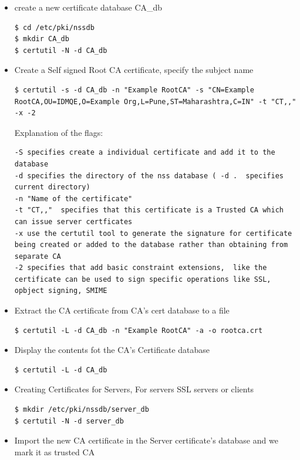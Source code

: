 \documentclass[12pt]{report}
\begin{document}
\begin{enumerate}[label*=\arabic*.]
\begin{itemize}
            \item create a new certificate database CA\_db
                \begin{lstlisting}[style=BashInputStyle]
$ cd /etc/pki/nssdb
$ mkdir CA_db
$ certutil -N -d CA_db
                \end{lstlisting}
            \item Create a Self signed Root CA certificate, specify the subject name
                \begin{lstlisting}[style=BashInputStyle]
$ certutil -s -d CA_db -n "Example RootCA" -s "CN=Example RootCA,OU=IDMQE,O=Example Org,L=Pune,ST=Maharashtra,C=IN" -t "CT,," -x -2
                \end{lstlisting}
                Explanation of the flags:
                \begin{lstlisting}
-S specifies create a individual certificate and add it to the database
-d specifies the directory of the nss database ( -d .  specifies current directory)
-n "Name of the certificate"
-t "CT,,"  specifies that this certificate is a Trusted CA which can issue server certficates
-x use the certutil tool to generate the signature for certificate being created or added to the database rather than obtaining from separate CA
-2 specifies that add basic constraint extensions,  like the certificate can be used to sign specific operations like SSL, opbject signing, SMIME
                \end{lstlisting}
            \item Extract the CA certificate from CA's cert database to a file
                \begin{lstlisting}[style=BashInputStyle]
$ certutil -L -d CA_db -n "Example RootCA" -a -o rootca.crt
                \end{lstlisting}
            \item Display the contents fot the CA's Certificate database
                \begin{lstlisting}[style=BashInputStyle] 
$ certutil -L -d CA_db
                \end{lstlisting}
            \item Creating Certificates for Servers, For servers SSL servers or clients
                \begin{lstlisting}[style=BashInputStyle]
$ mkdir /etc/pki/nssdb/server_db
$ certutil -N -d server_db
                \end{lstlisting}
            \item Import the new CA certificate in the Server certificate's database and we mark it as trusted CA

\end{itemize}
\end{enumerate}
\end{document}
